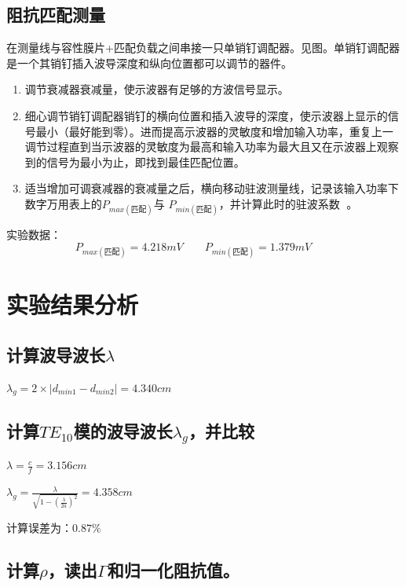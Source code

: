 \documentclass{../source/Experiment}
\begin{document}
        \subsection{阻抗匹配测量}
        在测量线与容性膜片+匹配负载之间串接一只单销钉调配器。见图。单销钉调配器是一个其销钉插入波导深度和纵向位置都可以调节的器件。
        \begin{enumerate}
            \item 调节衰减器衰减量，使示波器有足够的方波信号显示。
            \item 细心调节销钉调配器销钉的横向位置和插入波导的深度，使示波器上显示的信号最小（最好能到零）。进而提高示波器的灵敏度和增加输入功率，重复上一调节过程直到当示波器的灵敏度为最高和输入功率为最大且又在示波器上观察到的信号为最小为止，即找到最佳匹配位置。
            \item 适当增加可调衰减器的衰减量之后，横向移动驻波测量线，记录该输入功率下数字万用表上的$P_{max(\mbox{匹配})}$与 $P_{min(\mbox{匹配})}$，并计算此时的驻波系数 。
        \end{enumerate}
        实验数据：$$P_{max(\mbox{匹配})} = 4.218mV\qquad P_{min(\mbox{匹配})} = 1.379mV\qquad$$


    \section{实验结果分析}
        \subsection{计算波导波长$\lambda$}

        $\lambda_g = 2\times |d_{min1}-d_{min2}| = 4.340cm$

        \subsection{计算$TE_{10}$模的波导波长$\lambda_g$，并比较}


        $\lambda = \displaystyle \frac{c}{f} = 3.156cm$

        $\lambda_{g}= \displaystyle \frac{\lambda}{\sqrt{1-\left(\frac{\lambda}{2 a}\right)^{2}}} = 4.358cm$


        计算误差为：$0.87\% $

        \subsection{计算$\rho $，读出$\Gamma $和归一化阻抗值。}
\end{document}

